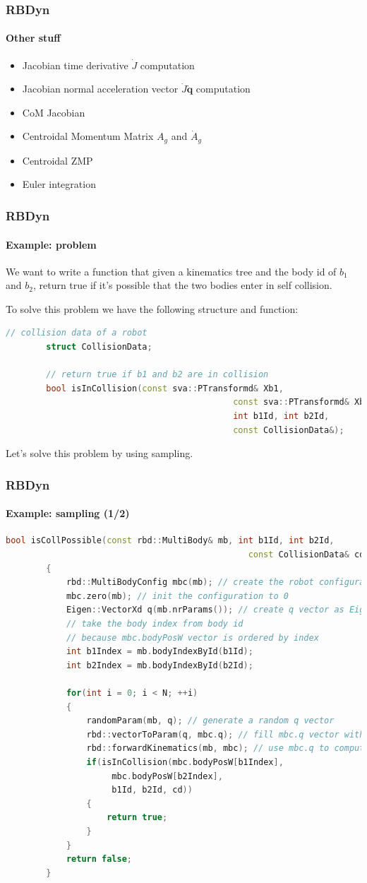 \documentclass{beamer}
\begin{document}
\begin{frame}
	\frametitle{RBDyn}
	\framesubtitle{Other stuff}
	\begin{itemize}
		\item Jacobian time derivative $ \dot{J} $ computation
		\item Jacobian normal acceleration vector $ \dot{J}\dot{\mathbf{q}} $ computation
		\item CoM Jacobian
		\item Centroidal Momentum Matrix $ A_g $ and $ \dot{A}_g $
		\item Centroidal ZMP
		\item Euler integration
	\end{itemize}
\end{frame}

\begin{frame}[fragile]
	\frametitle{RBDyn}
	\framesubtitle{Example: problem}
	We want to write a function that given a kinematics tree
	and the body id of $ b_1 $ and $ b_2 $, return true if it's possible that the two bodies enter in self collision.
	\\ \hfill

	To solve this problem we have the following structure and function:
	\begin{lstlisting}[language=C++]
		// collision data of a robot
		struct CollisionData;

		// return true if b1 and b2 are in collision
		bool isInCollision(const sva::PTransformd& Xb1,
											 const sva::PTransformd& Xb2,
											 int b1Id, int b2Id,
											 const CollisionData&);
	\end{lstlisting}
	
	Let's solve this problem by using sampling.
\end{frame}
\begin{frame}[fragile]
	\frametitle{RBDyn}
	\framesubtitle{Example: sampling (1/2)}
	\begin{lstlisting}[language=C++,basicstyle=\tiny]
		bool isCollPossible(const rbd::MultiBody& mb, int b1Id, int b2Id,
												const CollisionData& cd, int N)
		{
			rbd::MultiBodyConfig mbc(mb); // create the robot configuration
			mbc.zero(mb); // init the configuration to 0
			Eigen::VectorXd q(mb.nrParams()); // create q vector as Eigen3 vector
			// take the body index from body id
			// because mbc.bodyPosW vector is ordered by index
			int b1Index = mb.bodyIndexById(b1Id);
			int b2Index = mb.bodyIndexById(b2Id);

			for(int i = 0; i < N; ++i)
			{
				randomParam(mb, q); // generate a random q vector
				rbd::vectorToParam(q, mbc.q); // fill mbc.q vector with q
				rbd::forwardKinematics(mb, mbc); // use mbc.q to compute mbc.bodyPosW
				if(isInCollision(mbc.bodyPosW[b1Index],
					 mbc.bodyPosW[b2Index],
					 b1Id, b2Id, cd))
				{
					return true;
				}
			}
			return false;
		}
	\end{lstlisting}
\end{frame}
\end{document}
